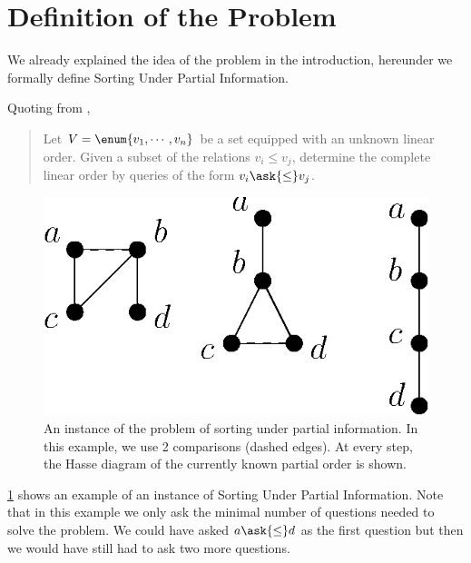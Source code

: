 \section{Definition of the Problem}

We already explained the idea of the problem in the introduction, hereunder we
formally define Sorting Under Partial Information.

Quoting from \citet*{cardinal:2013},

\begin{quotation}
Let $V = \enum{v_1 , \cdots , v_n}$ be a set
equipped with an unknown linear order. Given a subset of the relations $v_i
\leq v_j$, determine the complete linear order by queries of the form
\(v_i \ask{\leq} v_j\).
\end{quotation}


\begin{figure} \centering \includegraphics[height=0.2\textheight]{fig/supi/ex2}
\caption{An instance of the problem of sorting under partial information. In
this example, we use 2 comparisons (dashed edges). At every step, the Hasse
diagram of the currently known partial order is shown.}
\label{fig:supi:def:ex2} \end{figure}


\ref{fig:supi:def:ex2} shows an example of an instance of Sorting Under Partial
Information. Note that in this example we only ask the minimal number of
questions needed to solve the problem. We could have asked $a \ask{\le}
d$ as the first question but then we would have still had to ask two more
questions.
